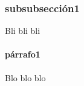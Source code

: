 \documentclass[a4paper,openright,12pt]{report}
\begin{document}
\subsubsection{subsubsección1}
Bli bli bli
\paragraph{párrafo1}
Blo blo blo

\end{document}
